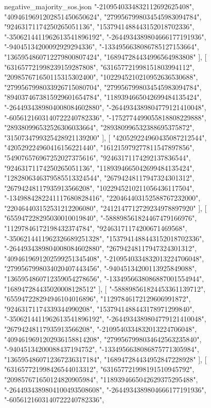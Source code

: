 \begin{filecontents*}[overwrite]{negative_majority_sos.json}
    "-2109540334832112692625408",
    "4094619691202851450650624",
    "2799567998034545983094784",
    "92463171174250265051136",
    "1537941488443152018702336",
    "-3506214411962613541896192",
    "-2644934389804666177191936",
    "-94045134200092929294336",
    "-1334956638086785127153664",
    "1365954860712279800807424",
    "168947284434996564983808"
   ],
   [
    "631657721998239159287808",
    "631657721998151803994112",
    "209857671650115315302400",
    "1022945210210952636530688",
    "2799567998033926715080704",
    "2799567998034545983094784",
    "8940374673815929601654784",
    "1189394665042699484135424",
    "-2644934389804008084602880",
    "-2644934389804779121410048",
    "-6056121603140722240782336",
    "-1752774499055818808229888",
    "289380996532526306033664",
    "289380996532388695375872",
    "3150734799325428921139200"
   ],
   [
    "420529224960435087212544",
    "420529224960416156221440",
    "161215979277811547897856",
    "549076576967252027375616",
    "92463171174292137836544",
    "92463171174250265051136",
    "1189394665042699484135424",
    "1282806346379585513324544",
    "26794248117947324301312",
    "26794248117935913566208",
    "1022945210211056436117504",
    "-1349884282241117680828416",
    "220464403152588767232000",
    "220464403152531212206080",
    "2412147712729234978897920"
   ],
   [
    "655947228295030010019840",
    "-588898561824467479166976",
    "11297846172198432374784",
    "92463171174200671469568",
    "-3506214411962326689251328",
    "1537941488443152018702336",
    "-2644934389804008084602880",
    "26794248117947324301312",
    "4094619691202599251345408",
    "-2109540334832013224706048",
    "2799567998034020407443456",
    "-94045134200113925849088",
    "1365954860712359054278656",
    "-1334956638086887001554944",
    "168947284435020008128512"
   ],
   [
    "-588898561824453361139712",
    "655947228294946104016896",
    "11297846172129606991872",
    "92463171174339344990208",
    "1537941488443178971299840",
    "-3506214411962613541896192",
    "-2644934389804779121410048",
    "26794248117935913566208",
    "-2109540334832013224706048",
    "4094619691202936158814208",
    "2799567998034642563235840",
    "-94045134200088437194752",
    "-1334956638086875771305984",
    "1365954860712367236317184",
    "168947284434952847228928"
   ],
   [
    "631657721998426544013312",
    "631657721998191510945792",
    "209857671650124820905984",
    "1189394665042629375295488",
    "-2644934389804100493508608",
    "-2644934389804666177191936",
    "-6056121603140722240782336",

\end{filecontents*}
